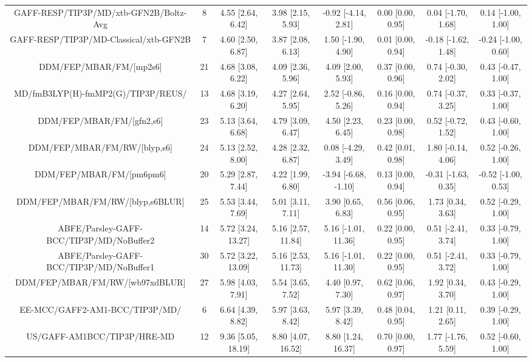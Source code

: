 \documentclass[8pt]{article}
\begin{document}
\begin{center}
\begin{footnotesize}
\begin{longtable}{|cccccccc|}
   GAFF-RESP/TIP3P/MD/xtb-GFN2B/Boltz-Avg &   8 &   4.55 [2.64, 6.42] &   3.98 [2.15, 5.93] &   -0.92 [-4.14, 2.81] &  0.00 [0.00, 0.95] &   0.04 [-1.70, 1.68] &   0.14 [-1.00, 1.00] \\
   GAFF-RESP/TIP3P/MD-Classical/xtb-GFN2B &   7 &   4.60 [2.50, 6.87] &   3.87 [2.08, 6.13] &    1.50 [-1.90, 4.90] &  0.01 [0.00, 0.94] &  -0.18 [-1.62, 1.48] &  -0.24 [-1.00, 0.60] \\
                  DDM/FEP/MBAR/FM/[mp2s6] &  21 &   4.68 [3.08, 6.22] &   4.09 [2.36, 5.96] &     4.09 [2.00, 5.93] &  0.37 [0.00, 0.96] &   0.74 [-0.30, 2.02] &   0.43 [-0.47, 1.00] \\
       MD/fmB3LYP(H)-fmMP2(G)/TIP3P/REUS/ &  13 &   4.68 [3.19, 6.20] &   4.27 [2.64, 5.95] &    2.52 [-0.86, 5.26] &  0.16 [0.00, 0.94] &   0.74 [-0.37, 3.25] &   0.33 [-0.37, 1.00] \\
                DDM/FEP/MBAR/FM/[gfn2,s6] &  23 &   5.13 [3.64, 6.68] &   4.79 [3.09, 6.47] &     4.50 [2.23, 6.45] &  0.23 [0.00, 0.98] &   0.52 [-0.72, 1.52] &   0.43 [-0.60, 1.00] \\
             DDM/FEP/MBAR/FM/RW/[blyp,s6] &  24 &   5.13 [2.52, 8.00] &   4.28 [2.32, 6.87] &    0.08 [-4.29, 3.49] &  0.42 [0.01, 0.98] &   1.80 [-0.14, 4.06] &   0.52 [-0.26, 1.00] \\
                 DDM/FEP/MBAR/FM/[pm6pm6] &  20 &   5.29 [2.87, 7.44] &   4.22 [1.99, 6.80] &  -3.94 [-6.68, -1.10] &  0.13 [0.00, 0.94] &  -0.31 [-1.63, 0.35] &  -0.52 [-1.00, 0.53] \\
         DDM/FEP/MBAR/FM/RW/[blyp,s6BLUR] &  25 &   5.53 [3.44, 7.69] &   5.01 [3.11, 7.11] &     3.90 [0.65, 6.83] &  0.56 [0.06, 0.95] &    1.73 [0.34, 3.63] &   0.52 [-0.29, 1.00] \\
 ABFE/Parsley-GAFF-BCC/TIP3P/MD/NoBuffer2 &  14 &  5.72 [3.24, 13.27] &  5.16 [2.57, 11.84] &   5.16 [-1.01, 11.36] &  0.22 [0.00, 0.95] &   0.51 [-2.41, 3.74] &   0.33 [-0.79, 1.00] \\
 ABFE/Parsley-GAFF-BCC/TIP3P/MD/NoBuffer1 &  30 &  5.72 [3.22, 13.09] &  5.16 [2.53, 11.73] &   5.16 [-1.01, 11.30] &  0.22 [0.00, 0.95] &   0.51 [-2.41, 3.72] &   0.33 [-0.79, 1.00] \\
          DDM/FEP/MBAR/FM/RW/[wb97xdBLUR] &  27 &   5.98 [4.03, 7.91] &   5.54 [3.65, 7.52] &     4.40 [0.97, 7.30] &  0.62 [0.06, 0.97] &    1.92 [0.34, 3.70] &   0.43 [-0.29, 1.00] \\
           EE-MCC/GAFF2-AM1-BCC/TIP3P/MD/ &   6 &   6.64 [4.39, 8.82] &   5.97 [3.63, 8.42] &     5.97 [3.39, 8.42] &  0.48 [0.04, 0.95] &    1.21 [0.11, 2.65] &   0.39 [-0.29, 1.00] \\
              US/GAFF-AM1BCC/TIP3P/HRE-MD &  12 &  9.36 [5.05, 18.19] &  8.80 [4.07, 16.52] &    8.80 [1.24, 16.37] &  0.70 [0.00, 0.97] &   1.77 [-1.76, 5.59] &   0.52 [-0.60, 1.00] \\
\end{longtable}
\end{footnotesize}
\end{center}
\end{document}
